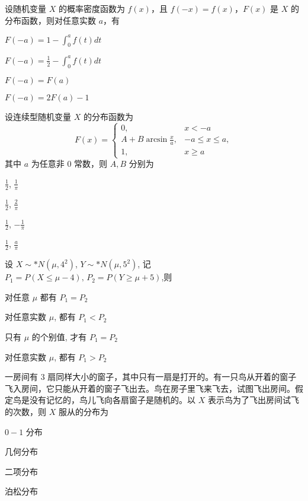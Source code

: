 \documentclass{exam-zh}
\begin{document}
\begin{question}
  设随机变量 $X$ 的概率密度函数为 $f(x)$，且  
  $f(-x) = f(x)$，$F(x)$ 是 $X$ 的分布函数，则对任意实数 $a$，有 \paren[B]
  \begin{choices}
    \item $F(-a) = 1 - \int_{0}^{a} f(t) dt$  
    \item $F(-a) = \frac{1}{2} - \int_{0}^{a} f(t) dt$  
    \item $F(-a) = F(a)$  
    \item $F(-a) = 2F(a) - 1$  
  \end{choices}
\end{question}

\begin{question}
  设连续型随机变量 $X$ 的分布函数为  
  $$F(x) = 
  \begin{cases} 
  0, & x < -a \\ 
  A + B \arcsin \frac{x}{a}, & -a \leq x \leq a, \\
  1, & x \geq a 
  \end{cases}$$  
  其中 $a$ 为任意非 $0$ 常数，则 $A, B$ 分别为 \paren[A]
  \begin{choices}
    \item $\frac{1}{2}$, $\frac{1}{\pi}$  
    \item $\frac{1}{2}$, $\frac{2}{\pi}$  
    \item $\frac{1}{2}$, $-\frac{1}{\pi}$  
    \item $\frac{1}{2}$, $\frac{a}{\pi}$  
  \end{choices}
\end{question}

\begin{question}
  设 $X \sim* N(\mu, 4^2)$, $Y \sim* N(\mu, 5^2)$, 记  
  $P_1 = P(X \leq \mu - 4), \, P_2 = P(Y \geq \mu + 5)$,则 
  \paren[A]
  \begin{choices}
    \item 对任意 $\mu$ 都有 $P_1 = P_2$  
    \item 对任意实数 $\mu$, 都有 $P_1 < P_2$  
    \item 只有 $\mu$ 的个别值, 才有 $P_1 = P_2$  
    \item 对任意实数 $\mu$, 都有 $P_1 > P_2$  
  \end{choices}
\end{question}

\begin{question}
  一房间有 $3$ 扇同样大小的窗子，其中只有一扇是打开的。有一只鸟从开着的窗子飞入房间，它只能从开着的窗子飞出去。鸟在房子里飞来飞去，试图飞出房间。假定鸟是没有记忆的，鸟儿飞向各扇窗子是随机的。以 $X$ 表示鸟为了飞出房间试飞的次数，则 $X$ 服从的分布为 \paren[B]
  \begin{choices}
    \item $0-1$ 分布  
    \item 几何分布  
    \item 二项分布  
    \item 泊松分布  
  \end{choices}
\end{question}
\end{document}

